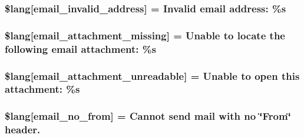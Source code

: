 \subsubsection[{\$lang}]{\setlength{\rightskip}{0pt plus 5cm}\$lang\mbox{[}\textquotesingle{}email\+\_\+invalid\+\_\+address\textquotesingle{}\mbox{]} = \textquotesingle{}Invalid email address\+: \%s\textquotesingle{}}\label{system_2language_2english_2email__lang_8php_a37759f6c728f3aaf8df6ca5bb8a3e832}
\hypertarget{system_2language_2english_2email__lang_8php_a09c0c415b48ef267bf9e36b555be67d9}{}
\subsubsection[{\$lang}]{\setlength{\rightskip}{0pt plus 5cm}\$lang\mbox{[}\textquotesingle{}email\+\_\+attachment\+\_\+missing\textquotesingle{}\mbox{]} = \textquotesingle{}Unable to locate the following email attachment\+: \%s\textquotesingle{}}\label{system_2language_2english_2email__lang_8php_a09c0c415b48ef267bf9e36b555be67d9}
\hypertarget{system_2language_2english_2email__lang_8php_acae2e9f7ade1ac9c6b67db0ff752414e}{}
\subsubsection[{\$lang}]{\setlength{\rightskip}{0pt plus 5cm}\$lang\mbox{[}\textquotesingle{}email\+\_\+attachment\+\_\+unreadable\textquotesingle{}\mbox{]} = \textquotesingle{}Unable to open this attachment\+: \%s\textquotesingle{}}\label{system_2language_2english_2email__lang_8php_acae2e9f7ade1ac9c6b67db0ff752414e}
\hypertarget{system_2language_2english_2email__lang_8php_a43fdb34364c17ce52df6c00d9da25f3d}{}
\subsubsection[{\$lang}]{\setlength{\rightskip}{0pt plus 5cm}\$lang\mbox{[}\textquotesingle{}email\+\_\+no\+\_\+from\textquotesingle{}\mbox{]} = \textquotesingle{}Cannot send mail with no \char`\"{}From\char`\"{} header.\textquotesingle{}}\label{system_2language_2english_2email__lang_8php_a43fdb34364c17ce52df6c00d9da25f3d}
\hypertarget{system_2language_2english_2email__lang_8php_a8f9d5a049f4dd899d4e61f6d56be5071}{}
